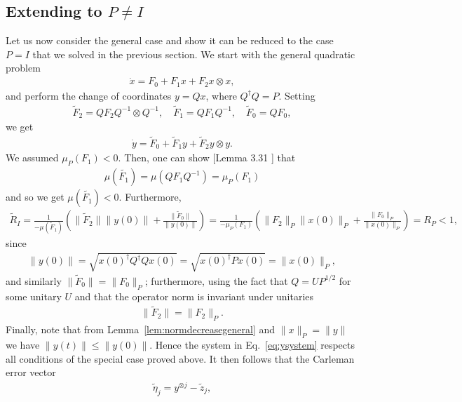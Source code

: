 \documentclass[superscriptaddress,onecolumn,nofootinbib,longbibliography,a4paper,accepted=2026-09-29]{quantumarticle}
\theoremstyle{plain}
\theoremstyle{definition}
\numberwithin{thm}{section}
\numberwithin{assumption}{section}
\numberwithin{lemma}{section}
\numberwithin{prop}{section}
\numberwithin{cor}{section}
\numberwithin{definition}{section}
\numberwithin{rmk}{section}
\numberwithin{equation}{section}
\begin{document}
\subsection{Extending to \texorpdfstring{$P \neq I$}{P/=I}}
 Let us now consider the general case and show it can be reduced to the case $P=I$ that we solved in the previous section. We start with the general quadratic problem
\begin{align}
\label{eq:xsystem}
    \dot{x} = F_0 +  F_1 x  + F_2 x \otimes x,
\end{align}
and perform the change of coordinates $y = Q x$, where $Q^\dag Q = P$. Setting
\begin{align}
\label{eq:Ftildetransformation}
    \tilde{F}_2 = Q F_2 Q^{-1} \otimes Q^{-1}, \quad \tilde{F}_1 = Q F_1 Q^{-1}, \quad \tilde{F}_0 = Q F_0,
\end{align}
we get
\begin{align}
\label{eq:ysystem}
    \dot{y} =  \tilde{F}_0 + \tilde{F}_1 y + \tilde{F}_2 y \otimes y.
\end{align}
We assumed $\mu_P(F_1) <0$. Then, one can show [Lemma 3.31 \cite{plischke2005transient}] that
\begin{align}
\label{eq:connectingtoPlognorm}
\mu(\tilde{F_1}) = \mu(Q F_1 Q^{-1}) = \mu_P(F_1) 
\end{align} 
and so we get $\mu(\tilde{F_1})<0$. 
Furthermore, 
\begin{align*}
   \tilde{R}_{I} = \frac{1}{-\mu(\tilde{F}_{1})} \left (  \|\tilde{F}_{2}\| \|y(0)\| + \frac{\|\tilde{F}_0\|}{ \|y(0)\|} \right )  = \frac{1}{-\mu_P(F_{1})} \left (  \|F_{2}\|_P \|x(0)\|_P + \frac{\|F_0\|_P}{ \|x(0)\|_P} \right ) = R_P <1,
\end{align*}
since
\begin{align}
    \| y(0) \| = \sqrt{ x(0)^\dag Q^\dag Q x(0)} = \sqrt{x(0)^\dag P  x(0)} =   \| x(0)\|_P,
\end{align}
and similarly $\| \tilde{F}_0\| = \| F_0\|_P$; furthermore, using the fact that $Q = U P^{1/2}$ for some unitary $U$ and that the operator norm is invariant under unitaries 
\begin{align}
\label{eq:connectingtoPoperatornorm}
    \| \tilde{F}_2\| = \| F_2\|_P.
\end{align}
Finally, note that from Lemma~\ref{lem:normdecreasegeneral} and $\| x\|_P = \| y\|$ we have $\| y(t)\| \leq \| y(0)\|$. Hence the system in Eq.~\eqref{eq:ysystem} respects all conditions of the special case proved above.
It then follows that the Carleman error vector
\begin{align}
    \tilde{\eta}_j = y^{\otimes j} - \tilde{z}_j,
\end{align}
\end{document}
